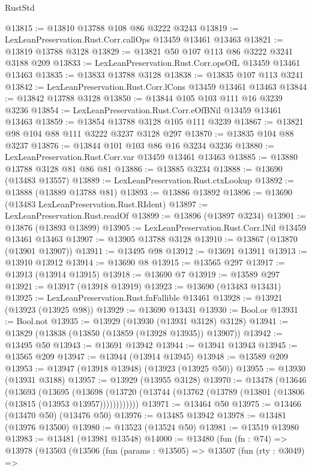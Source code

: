 \begin{lexlean}{RustStd}
\begin{coremodule}
{\begin{coremodule}
{{{{{{{{{{{{{{{{{{{{{{{{{{{{{{{{{{{{{@13815 := @13810 @13788 @108 @86 @3222 @3243
@13819 := LexLeanPreservation.Rust.Corr.callOps @13459 @13461 @13463
@13821 := @13819 @13788 @3128
@13829 := @13821 @50 @107 @113 @86 @3222 @3241 @3188 @209
@13833 := LexLeanPreservation.Rust.Corr.opsOfL @13459 @13461 @13463
@13835 := @13833 @13788 @3128
@13838 := @13835 @107 @113 @3241
@13842 := LexLeanPreservation.Rust.Corr.lCons @13459 @13461 @13463
@13844 := @13842 @13788 @3128
@13850 := @13844 @105 @103 @111 @16 @3239 @3236
@13854 := LexLeanPreservation.Rust.Corr.eOfBNil @13459 @13461 @13463
@13859 := @13854 @13788 @3128 @105 @111 @3239
@13867 := @13821 @98 @104 @88 @111 @3222 @3237 @3128 @297
@13870 := @13835 @104 @88 @3237
@13876 := @13844 @101 @103 @86 @16 @3234 @3236
@13880 := LexLeanPreservation.Rust.Corr.var @13459 @13461 @13463
@13885 := @13880 @13788 @3128 @81 @86 @81
@13886 := @13885 @3234
@13888 := @13690 (@13483 @13557)
@13889 := LexLeanPreservation.Rust.ctxLookup
@13892 := @13888 (@13889 @13788 @81)
@13893 := @13886 @13892
@13896 := @13690 (@13483 LexLeanPreservation.Rust.RIdent)
@13897 := LexLeanPreservation.Rust.readOf
@13899 := @13896 (@13897 @3234)
@13901 := @13876 (@13893 @13899)
@13905 := LexLeanPreservation.Rust.Corr.lNil @13459 @13461 @13463
@13907 := @13905 @13788 @3128
@13910 := @13867 (@13870 (@13901 @13907))
@13911 := @13495 @98
@13912 := @13691 @13911
@13913 := @13910 @13912
@13914 := @13690 @8
@13915 := @13565 @297
@13917 := @13913 (@13914 @13915)
@13918 := @13690 @7
@13919 := @13589 @297
@13921 := @13917 (@13918 @13919)
@13923 := @13690 (@13483 @13431)
@13925 := LexLeanPreservation.Rust.fnFallible @13461
@13928 := @13921 (@13923 (@13925 @98))
@13929 := @13690 @13431
@13930 := Bool.or
@13931 := Bool.not
@13935 := @13929 (@13930 (@13931 @3128) @3128)
@13941 := @13829 (@13838 (@13850 (@13859 (@13928 @13935)) @13907))
@13942 := @13495 @50
@13943 := @13691 @13942
@13944 := @13941 @13943
@13945 := @13565 @209
@13947 := @13944 (@13914 @13945)
@13948 := @13589 @209
@13953 := @13947 (@13918 @13948) (@13923 (@13925 @50))
@13955 := @13930 (@13931 @3188)
@13957 := @13929 (@13955 @3128)
@13970 := @13478
    (@13646
      (@13693
        (@13695
          (@13698 (@13720 (@13744 (@13762 (@13789 (@13801 (@13806 (@13815 (@13953 @13957))))))))))))
@13971 := @13464 @50
@13975 := @13466 (@13470 @50) (@13476 @50)
@13976 := @13485 @13942
@13978 := @13481 (@13976 @13500)
@13980 := @13523 (@13524 @50)
@13981 := @13519 @13980
@13983 := @13481 (@13981 @13548)
@14000 := @13480
    (fun (fn : @74) =>
    @13978
      (@13503
        (@13506
          (fun (params : @13505) =>
          @13507
            (fun (rty : @3049) =>
}}}}}}}}}}}}}}}}}}}}}}}}}}}}}}}}}}}}}
\end{coremodule}}
\end{coremodule}
\end{lexlean}
